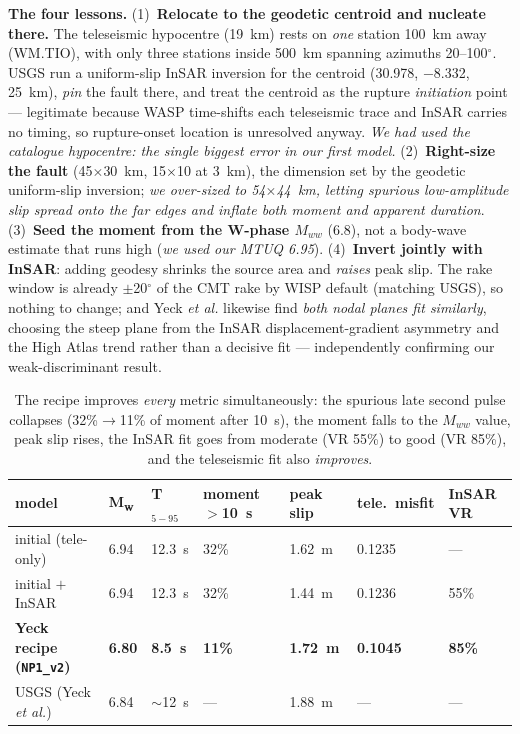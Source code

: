 \documentclass[11pt]{article}
\newcommand{\Mw}{M\textsubscript{w}}
\begin{document}
\textbf{The four lessons.} (1)~\textbf{Relocate to the geodetic centroid and nucleate there.} The
teleseismic hypocentre (19~km) rests on \emph{one} station 100~km away (WM.TIO), with only three
stations inside 500~km spanning azimuths 20--100$^\circ$. USGS run a uniform-slip InSAR inversion
for the centroid (30.978, $-$8.332, 25~km), \emph{pin} the fault there, and treat the centroid as
the rupture \emph{initiation} point --- legitimate because WASP time-shifts each teleseismic trace
and InSAR carries no timing, so rupture-onset location is unresolved anyway. \emph{We had used the
catalogue hypocentre: the single biggest error in our first model.} (2)~\textbf{Right-size the
fault} (45$\times$30~km, 15$\times$10 at 3~km), the dimension set by the geodetic uniform-slip
inversion; \emph{we over-sized to 54$\times$44~km, letting spurious low-amplitude slip spread onto
the far edges and inflate both moment and apparent duration}. (3)~\textbf{Seed the moment from the
W-phase $M_{ww}$} (6.8), not a body-wave estimate that runs high (\emph{we used our MTUQ 6.95}).
(4)~\textbf{Invert jointly with InSAR}: adding geodesy shrinks the source area and \emph{raises}
peak slip. The rake window is already $\pm$20$^\circ$ of the CMT rake by WISP default (matching
USGS), so nothing to change; and Yeck \emph{et al.} likewise find \emph{both nodal planes fit
similarly}, choosing the steep plane from the InSAR displacement-gradient asymmetry and the High
Atlas trend rather than a decisive fit --- independently confirming our weak-discriminant result.

\begin{table}[H]\centering\small
\begin{tabular}{lllllll}
\toprule
model & \Mw & T$_{5-95}$ & moment $>$10~s & peak slip & tele.\ misfit & InSAR VR \\
\midrule
initial (tele-only) & 6.94 & 12.3~s & 32\% & 1.62~m & 0.1235 & --- \\
initial $+$ InSAR & 6.94 & 12.3~s & 32\% & 1.44~m & 0.1236 & 55\% \\
\textbf{Yeck recipe (\texttt{NP1\_v2})} & \textbf{6.80} & \textbf{8.5~s} & \textbf{11\%} & \textbf{1.72~m} & \textbf{0.1045} & \textbf{85\%} \\
USGS (Yeck \emph{et al.}) & 6.84 & $\sim$12~s & --- & 1.88~m & --- & --- \\
\bottomrule
\end{tabular}
\caption{The recipe improves \emph{every} metric simultaneously: the spurious late second pulse
collapses (32\%$\to$11\% of moment after 10~s), the moment falls to the $M_{ww}$ value, peak slip
rises, the InSAR fit goes from moderate (VR 55\%) to good (VR 85\%), and the teleseismic fit also
\emph{improves}.}
\end{table}
\end{document}
